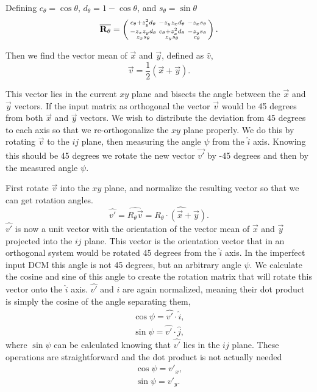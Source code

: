 \documentclass{article}
\def\matrix#1{\overline{\bf{#1}}}
\begin{document}
Defining $c_\theta=\cos\theta$, $d_\theta=1-\cos\theta$, and $s_\theta=\sin\theta$
\begin{equation}
\matrix{R_\theta} = \begin{pmatrix}
\begin{smallmatrix}
	c_\theta + z_y^2d_\theta &  -z_yz_xd_\theta & -z_xs_\theta \\
	-z_xz_yd_\theta & c_\theta + z_x^2d_\theta & - z_ys_\theta \\
	z_xs_\theta & z_ys_\theta & c_\theta
\end{smallmatrix}
\end{pmatrix}.
\end{equation}

Then we find the vector mean of $\vec{x}$ and $\vec{y}$, defined as $\hat{v}$,
\begin{equation}
	\vec{v} = \frac{1}{2}\left(\vec{x}+\vec{y}\right).
\end{equation}

This vector lies in the current $xy$ plane and bisects the angle between the $\vec{x}$ and $\vec{y}$ vectors. If the input matrix as orthogonal the vector $\vec{v}$ would be 45 degrees from both $\vec{x}$ and $\vec{y}$ vectors. We wish to distribute the deviation from 45 degrees to each axis so that we re-orthogonalize the $xy$ plane properly. We do this by rotating $\vec{v}$ to the $ij$ plane, then measuring the angle $\psi$ from the $\hat{i}$ axis. Knowing this should be 45 degrees we rotate the new vector $\vec{v'}$ by -45 degrees and then by the measured angle $\psi$. 
 
First rotate $\vec{v}$ into the $xy$ plane, and normalize the resulting vector so that we can get rotation angles.
\begin{equation}
	\hat{v'} = \widehat{R_\theta\vec{v}} = \widehat{R_\theta\cdot\left(\vec{x}+\vec{y}\right)}.
\end{equation}
$\hat{v'}$ is now a unit vector with the orientation of the vector mean of $\vec{x}$ and $\vec{y}$ projected into the $ij$ plane. This vector is the orientation vector that in an orthogonal system would be rotated 45 degrees from the $\hat{i}$ axis. In the imperfect input DCM this angle is not 45 degrees, but an arbitrary angle $\psi$. We calculate the cosine and sine of this angle to create the rotation matrix that will rotate this vector onto the $\hat{i}$ axis. $\hat{v'}$ and $\hat{i}$ are again normalized, meaning their dot product is simply the cosine of the angle separating them,
\begin{eqnarray}
	\cos\psi = \hat{v'}\cdot\hat{i},\\
	\sin\psi = \hat{v'}\cdot\hat{j},
\end{eqnarray}
where $\sin\psi$ can be calculated knowing that $\hat{v'}$ lies in the $ij$ plane. These operations are straightforward and the dot product is not actually needed
\begin{eqnarray}
	\cos\psi = v'_x,\\
	\sin\psi = v'_y.
\end{eqnarray}
\end{document}
